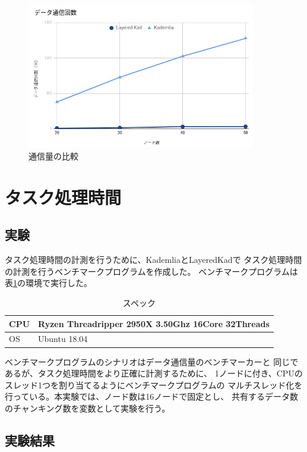 \documentclass[sotsuron]{jcsie}
\begin{document}
\begin{figure}[H]
	\centering
	\includegraphics[width=10cm]{./assets/image/traffic_graph.png}
	\caption{通信量の比較}
	\label{fig:traffic-graph}
\end{figure}

\section{タスク処理時間}
\subsection{実験}
タスク処理時間の計測を行うために、KademliaとLayeredKadで
タスク処理時間の計測を行うベンチマークプログラムを作成した。
ベンチマークプログラムは表\ref{table:spec-ryzen}の環境で実行した。

\begin{table}[H]
	\caption{スペック}	
	\centering
	\label{table:spec-ryzen}
	\begin{tabular}{|l|l|}
		\hline
		CPU &   
		Ryzen Threadripper 2950X 3.50Ghz 16Core 32Threads \\ 
		\hline	
		OS  &   
		Ubuntu 18.04 \\ 
		\hline
	\end{tabular}	
\end{table}

ベンチマークプログラムのシナリオはデータ通信量のベンチマーカーと
同じであるが、タスク処理時間をより正確に計測するために、
1ノードに付き、CPUのスレッド1つを割り当てるようにベンチマークプログラムの
マルチスレッド化を行っている。本実験では、ノード数は16ノードで固定とし、
共有するデータ数のチャンキング数を変数として実験を行う。

\subsection{実験結果}
\end{document}
